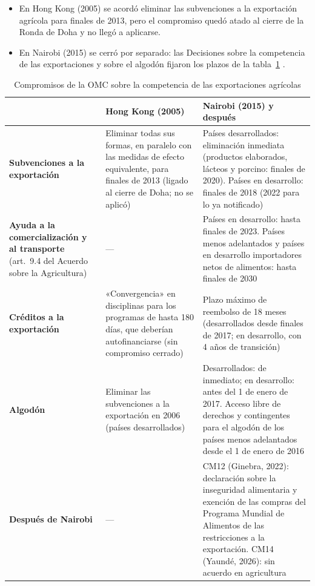 \documentclass[11pt]{article}
\begin{document}
\begin{itemize}
\item En Hong Kong (2005) se acordó eliminar las subvenciones a la exportación agrícola para finales de 2013, pero el compromiso quedó atado al cierre de la Ronda de Doha y no llegó a aplicarse\nocite{OMC2005HongKong}.
\item En Nairobi (2015) se cerró por separado: las Decisiones sobre la competencia de las exportaciones y sobre el algodón fijaron los plazos de la tabla~\ref{tab:agricultura}\nocite{OMC2015CompetenciaExportaciones,OMC2015Algodon} .
\end{itemize}
\begin{table}[H]
\centering
\caption{Compromisos de la OMC sobre la competencia de las exportaciones agrícolas}\label{tab:agricultura}
\small
\begin{tabular}{>{\raggedright\arraybackslash}m{3.4cm}>{\raggedright\arraybackslash}m{5.4cm}>{\raggedright\arraybackslash}m{6.0cm}}
\toprule
\rowcolor{tceeazulpalido} & \textbf{Hong Kong (2005)} & \textbf{Nairobi (2015) y después}\\
\midrule
\textbf{Subvenciones a la exportación} & Eliminar todas sus formas, en paralelo con las medidas de efecto equivalente, para finales de 2013 (ligado al cierre de Doha; no se aplicó) & Países desarrollados: eliminación inmediata (productos elaborados, lácteos y porcino: finales de 2020). Países en desarrollo: finales de 2018 (2022 para lo ya notificado)\\
\addlinespace[0.3em]
\textbf{Ayuda a la comercialización y al transporte} (art.~9.4 del Acuerdo sobre la Agricultura) & --- & Países en desarrollo: hasta finales de 2023. Países menos adelantados y países en desarrollo importadores netos de alimentos: hasta finales de 2030\\
\addlinespace[0.3em]
\textbf{Créditos a la exportación} & «Convergencia» en disciplinas para los programas de hasta 180 días, que deberían autofinanciarse (sin compromiso cerrado) & Plazo máximo de reembolso de 18 meses (desarrollados desde finales de 2017; en desarrollo, con 4 años de transición)\\
\addlinespace[0.3em]
\textbf{Algodón} & Eliminar las subvenciones a la exportación en 2006 (países desarrollados) & Desarrollados: de inmediato; en desarrollo: antes del 1 de enero de 2017. Acceso libre de derechos y contingentes para el algodón de los países menos adelantados desde el 1 de enero de 2016\\
\addlinespace[0.3em]
\textbf{Después de Nairobi} & --- & CM12 (Ginebra, 2022): declaración sobre la inseguridad alimentaria y exención de las compras del Programa Mundial de Alimentos de las restricciones a la exportación. CM14 (Yaundé, 2026): sin acuerdo en agricultura\\
\bottomrule
\end{tabular}
\end{table}
\end{document}

